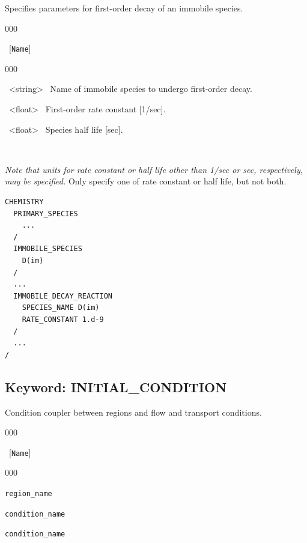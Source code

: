 \hfill\hyperlink{target_key}{\return}

 Specifies parameters for first-order decay of an immobile species.

\begin{deflist}{000}
\item[IMMOBILE\_DECAY\_REACTION] \ [{\tt Name}]
\begin{deflist}{000}
\item[SPECIES\_NAME] \ <string> \ Name of immobile species to undergo first-order decay.
\item[RATE\_CONSTANT] \ <float> \ First-order rate constant [1/sec].
\item[HALF\_LIFE] \ <float> \ Species half life [sec]. 
\end{deflist}
\item[\keyend] ~
\end{deflist}

 {\em Note that units for rate constant or half life other than 1/sec or sec, respectively, may be specified.} Only specify one of rate constant or half life, but not both.

\begin{mdframed}


\footnotesize
\begin{verbatim}
CHEMISTRY
  PRIMARY_SPECIES
    ...
  /
  IMMOBILE_SPECIES
    D(im)
  /
  ...
  IMMOBILE_DECAY_REACTION
    SPECIES_NAME D(im)
    RATE_CONSTANT 1.d-9
  /
  ...
/
\end{verbatim}
\normalsize
\end{mdframed}

\hyperlink{target_key}{\return}



\newpage
\protect\hypertarget{target_init}{}

\subsection{Keyword: INITIAL\_CONDITION}

\hfill\hyperlink{target_key}{\return}

 Condition coupler between regions and flow and transport conditions.

\begin{deflist}{000}
\item[INITIAL\_CONDITION] \ [{\tt Name}]
\begin{deflist}{000}
\item[REGION] {\tt region\_name}
\item[FLOW\_CONDITION] {\tt condition\_name}
\item[TRANSPORT\_CONDITION] {\tt condition\_name}
\end{deflist}
\item[\keyend] ~
\end{deflist}

